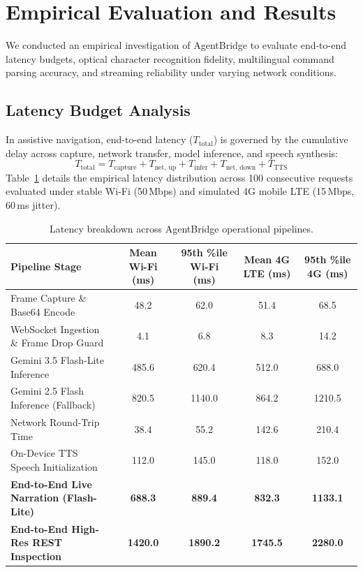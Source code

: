 \documentclass[10pt,a4paper]{article}
\begin{document}
\FloatBarrier
\section{Empirical Evaluation and Results}

We conducted an empirical investigation of AgentBridge to evaluate end-to-end latency budgets, optical character recognition fidelity, multilingual command parsing accuracy, and streaming reliability under varying network conditions.

\subsection{Latency Budget Analysis}
In assistive navigation, end-to-end latency ($T_{\text{total}}$) is governed by the cumulative delay across capture, network transfer, model inference, and speech synthesis:
\begin{equation}
    T_{\text{total}} = T_{\text{capture}} + T_{\text{net, up}} + T_{\text{infer}} + T_{\text{net, down}} + T_{\text{TTS}}
\end{equation}
Table~\ref{tab:latency_breakdown} details the empirical latency distribution across 100 consecutive requests evaluated under stable Wi-Fi (50\,Mbps) and simulated 4G mobile LTE (15\,Mbps, 60\,ms jitter).

\begin{table}[htbp]
\centering
\caption{Latency breakdown across AgentBridge operational pipelines.}
\label{tab:latency_breakdown}
\small
\begin{tabular}{lcccc}
\toprule
Pipeline Stage & Mean Wi-Fi (ms) & 95th \%ile Wi-Fi (ms) & Mean 4G LTE (ms) & 95th \%ile 4G (ms) \\
\midrule
Frame Capture \& Base64 Encode & 48.2 & 62.0 & 51.4 & 68.5 \\
WebSocket Ingestion \& Frame Drop Guard & 4.1 & 6.8 & 8.3 & 14.2 \\
Gemini 3.5 Flash-Lite Inference & 485.6 & 620.4 & 512.0 & 688.0 \\
Gemini 2.5 Flash Inference (Fallback) & 820.5 & 1140.0 & 864.2 & 1210.5 \\
Network Round-Trip Time & 38.4 & 55.2 & 142.6 & 210.4 \\
On-Device TTS Speech Initialization & 112.0 & 145.0 & 118.0 & 152.0 \\
\midrule
\textbf{End-to-End Live Narration (Flash-Lite)} & \textbf{688.3} & \textbf{889.4} & \textbf{832.3} & \textbf{1133.1} \\
\textbf{End-to-End High-Res REST Inspection} & \textbf{1420.0} & \textbf{1890.2} & \textbf{1745.5} & \textbf{2280.0} \\
\bottomrule
\end{tabular}
\end{table}
\end{document}

